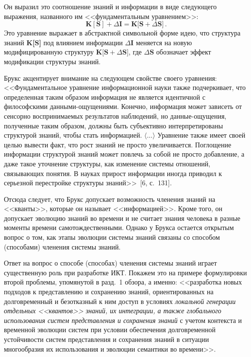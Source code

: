 \begin{multicols}{2}
      Он выразил это соотношение знаний и информации в виде следующего выражения,
названного им <<фундаментальным уравнением>>:
      $$
      \mathbf{K [S]} + \Delta \mathbf{I} = \mathbf{K [S}+\Delta\mathbf{S]}\,.
      $$
      Это уравнение выражает в абстрактной символьной форме идею, что структура знаний
\textbf{K[S]} под влиянием информации $\Delta \mathbf{I}$ меняется на новую
модифицированную структуру $\mathbf{K[S} + \Delta \mathbf{S]}$, где $\Delta \mathbf{S}$
обозначает эффект модификации структуры знаний.

      Брукс акцентирует внимание на следующем свойстве своего уравнения:
<<Фундаментальное уравнение информационной науки также подчеркивает, что определенная
таким образом информация не является идентичной с философскими данными-ощущениями.
Конечно, информация может зависеть от сенсорно воспринимаемых результатов наблюдений,
но данные-ощущения, полученные таким образом, должны быть субъективно
интерпретированы структурой знаний, чтобы стать информацией. $\langle\ldots\rangle$
Уравнение также имеет своей целью вывести факт, что рост знаний не просто увеличивается.
Поглощение информации структурой знаний может повлечь за собой не прос\-то добавление, а
даже такое уточнение структуры, как изменение системы отношений, связывающих понятия. В
науках прирост информации иногда приводил к серьезной перестройке структуры
знаний>>~[6, с.~131].

      Отсюда следует, что Брукс допускает возможность членения знаний на <<кванты>>,
которые он называет <<информацией>>. Кроме того, он допускает эволюцию знаний во
времени и не считает знания человека в разные моменты времени самотождественными.
Однако у Брукса остается открытым вопрос о том, как этапы эволюции системы знаний связаны
со способом (способами) членения системы знаний.

      Ответ на вопрос о способе (способах) членения системы знаний играет существенную
роль при разработке ИКТ. Покажем это на примере формулировки второй проблемы,
упомянутой в разд.~1 обзора, а именно: <<разработка новых подходов к представлению и
сохранению знаний, ориентированных на долговременный и безотказный к ним доступ в
условиях \textit{локальной генерации отдельных <<квантов>> знаний, их интеграции, а
также глобального использования систем представления и сохранения знаний} с учетом
контекста и временной эволюции систем при условии обеспечения долговременной
устойчивости систем представления и сохранения знаний в ситуации многообразия их
использования и эволюции семантики во времени>>.


\end{multicols}
